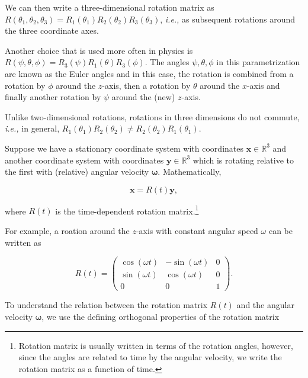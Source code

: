 \documentclass[a4paper,12pt]{report}
\begin{document}
We can then write a three-dimensional rotation matrix as \( R(\theta_1, \theta_2, \theta_3) = R_1(\theta_1) R_2(\theta_2) R_3(\theta_3) \), \textit{i.e.,} as subsequent rotations around the three coordinate axes. 

Another choice that is used more often in physics is \( R(\psi, \theta, \phi) = R_3(\psi) R_1(\theta) R_3(\phi) \). The angles \( \psi, \theta, \phi \) in this parametrization are known as the Euler angles and in this case, the rotation is combined from a rotation by \( \phi \) around the \( z \)-axis, then a rotation by \( \theta \) around the \( x \)-axis and finally another rotation by \( \psi \) around the (new) \( z \)-axis.

Unlike two-dimensional rotations, rotations in three dimensions do not commute, \textit{i.e.,} in general, \( R_1(\theta_1) R_2(\theta_2) \neq R_2(\theta_2) R_1(\theta_1) \).

Suppose we have a stationary coordinate system with coordinates \(\mathbf{x} \in \mathbb{R}^3\) and another coordinate system with coordinates \(\mathbf{y} \in \mathbb{R}^3\) which is rotating relative to the first with (relative) angular velocity \(\boldsymbol{\omega } \). Mathematically,

\begin{equation}
\mathbf{x} = R(t) \mathbf{y} ,
\end{equation}

where \( R(t) \) is the time-dependent rotation matrix.\footnote{Rotation matrix is usually written in terms of the rotation angles, however, since the angles are related to time by the angular velocity, we write the rotation matrix as a function of time.} 

For example, a roation around the \(z\)-axis with constant angular speed \(\omega \) can be written as 

\begin{equation}
    R(t) = \begin{pmatrix}
    \cos(\omega t) & -\sin(\omega t) & 0 \\
    \sin(\omega t) & \cos(\omega t) & 0 \\
    0 & 0 & 1
    \end{pmatrix}. \label{simplerotation} 
\end{equation}

To understand the relation between the rotation matrix \(R(t)\) and the angular velocity \(\boldsymbol{\omega } \), we use the defining orthogonal properties of the rotation matrix  
\end{document}
